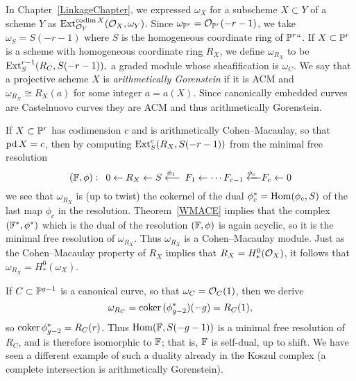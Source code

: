 In Chapter~\ref{LinkageChapter},  we expressed $\omega_X$
for a subscheme $X\subset Y$ of a scheme $Y$ as
$\Ext^{\codim X}_{\sO_Y}(\sO_X, \omega_Y)$. 
Since $\omega_{\PP^{r}} = \sO_{\PP^{r}}(-r-1)$,
we take $\omega_{S} = S(-r-1)$
where $S$
is the homogeneous coordinate ring of $\PP^r` `$.
If $X\subset \PP^r$ is a scheme
with homogeneous coordinate ring $R_{X}$,
we define $\omega_{R_X}$ to be 
$
\Ext^{r-1}_S(R_C, S(-r-1)),
$
 a graded module whose sheafification 
 is  $\omega_C$.
We say that a projective scheme $X$ is
\emph{arithmetically Gorenstein}
%
if it is ACM and 
$\omega_{R_{X}} \cong R_{X}(a)$ for some integer $a = a(X)$. Since
canonically embedded curves are Castelnuovo curves they are ACM
%
and thus arithmetically Gorenstein.

If $X\subset \PP^{r}$ has codimension $c$ and is arithmetically Cohen--Macaulay, so that
$\pd X = c$,  then by
computing $\Ext^{c}_S(R_X, S(-r-1))$ from the 
minimal free resolution
%
$$
(\FF, \phi):\quad 
0\leftarrow R_X \leftarrow S\luto{\phi_1} F_1 \leftarrow \cdots  
F_{c -1} \luto{\!\phi_{c}}\hskip-15pt-\ F_{c}\leftarrow 0
$$
we see that $\omega_{R_X}$ is (up to twist)
 the cokernel of the dual $\phi_{c}^{*} = \Hom(\phi_{c}, S)$
of the last map $\phi_{c}$ in the resolution. 
%
Theorem~\ref{WMACE}
implies that the complex $(\FF^*, \phi^*)$ which is the dual
of the  resolution $(\FF, \phi)$ is again acyclic, so it is the minimal
free resolution of $\omega_{R_X}$. Thus
$\omega_{R_X}$ is a Cohen--Macaulay module. Just as the Cohen--Macaulay
property of
$R_X$ implies that $R_X = H^0_*(\sO_X)$, it follows that $\omega_{R_X}
= H^0_*(\omega_X)$.

If $C\subset \PP^{g-1}$ is a canonical curve, so that $\omega_C = \sO_C(1)$,
then we derive
$$
\omega_{R_C} = \coker(\phi_{g-2}^*)(-g) = R_C(1)
,
$$
so $\coker \phi_{g-2}^* = R_C(r)$. Thus $\Hom(\FF, S(-g-1))$ is a
minimal free resolution of $R_C$, and is therefore isomorphic to
$\FF$; that is, $\FF$ is self-dual, up to shift.
We have seen a different example of such a duality already
%
%
in the Koszul complex (a complete intersection is arithmetically Gorenstein).

